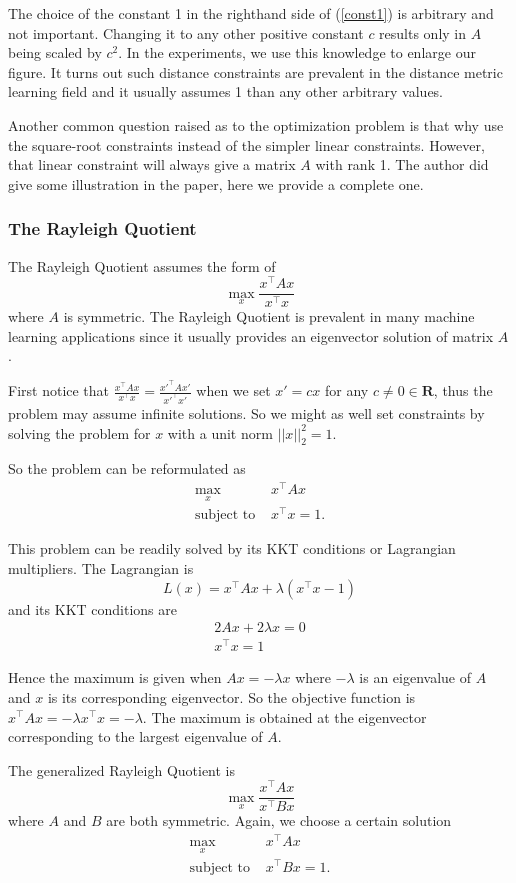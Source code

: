 \documentclass[12pt]{article}
\newcommand\R{\mathbf{R}}
\newcommand\T{^\top}
\newcommand{\st}{\text{subject to }}
\begin{document}
The choice of the constant 1 in the righthand side of (\ref{const1}) is arbitrary and not important. Changing it to any other positive constant $c$ results only in $A$ being scaled by $c^2$. In the experiments, we use this knowledge to enlarge our figure. It turns out such distance constraints are prevalent in the distance metric learning field and it usually assumes 1 than any other arbitrary values.

Another common question raised as to the optimization problem is that why use the square-root constraints instead of the simpler linear constraints. However, that linear constraint will always give a matrix $A$ with rank 1. The author did give some illustration in the paper, here we provide a complete one.  

\subsubsection{The Rayleigh Quotient}
The  Rayleigh Quotient assumes the form of 
\[\max_x \frac{x\T Ax}{x\T x}\]
where $A$ is symmetric. The  Rayleigh Quotient is prevalent in many machine learning applications since it usually provides an eigenvector solution of matrix $A$.

First notice that $\frac{x\T Ax}{x\T x} = \frac{{x'}\T Ax'}{{x'}\T x'}$ when we set $x' = cx$ for any $c\neq 0\in \R$, thus the problem may assume infinite solutions. So we might as well set constraints by solving the problem for $x$ with a unit norm $||x||_2^2=1$.

So the problem can be reformulated as 
\begin{align*}
\max_x\ & x\T Ax \\
\st & x\T x = 1.
\end{align*}

This problem can be readily solved by its KKT conditions or Lagrangian multipliers. The Lagrangian is 
\[L(x) = x\T Ax + \lambda(x\T x - 1)\] and its KKT conditions are 
\begin{align}
2Ax + 2\lambda x = 0 \\
x\T x  = 1
\end{align}

Hence the maximum is given when $Ax = -\lambda x$ where $-\lambda$ is an eigenvalue of $A$ and $x$ is its corresponding eigenvector. So the objective function is $x\T Ax = -\lambda x\T x = -\lambda$. The maximum is obtained at the eigenvector corresponding to the largest eigenvalue of $A$.

The generalized Rayleigh Quotient is \[\max_x \frac{x\T Ax}{x\T Bx}\] where $A$ and $B$ are both symmetric. Again, we choose a certain solution 
\begin{align*}
\max_x\ & x\T Ax \\
\st & x\T B x = 1.
\end{align*}
\end{document}
